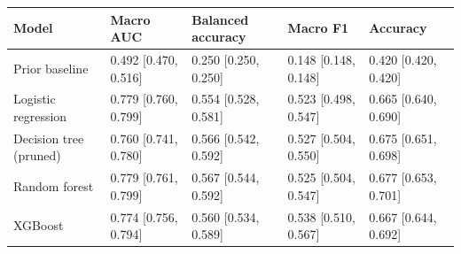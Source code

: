 \begin{tabular}{lllll}
\toprule
\textbf{Model} & \textbf{Macro AUC} & \textbf{Balanced accuracy} & \textbf{Macro F1} & \textbf{Accuracy} \\
\midrule
Prior baseline & 0.492 [0.470, 0.516] & 0.250 [0.250, 0.250] & 0.148 [0.148, 0.148] & 0.420 [0.420, 0.420] \\
Logistic regression & 0.779 [0.760, 0.799] & 0.554 [0.528, 0.581] & 0.523 [0.498, 0.547] & 0.665 [0.640, 0.690] \\
Decision tree (pruned) & 0.760 [0.741, 0.780] & 0.566 [0.542, 0.592] & 0.527 [0.504, 0.550] & 0.675 [0.651, 0.698] \\
Random forest & 0.779 [0.761, 0.799] & 0.567 [0.544, 0.592] & 0.525 [0.504, 0.547] & 0.677 [0.653, 0.701] \\
XGBoost & 0.774 [0.756, 0.794] & 0.560 [0.534, 0.589] & 0.538 [0.510, 0.567] & 0.667 [0.644, 0.692] \\
\bottomrule
\end{tabular}

